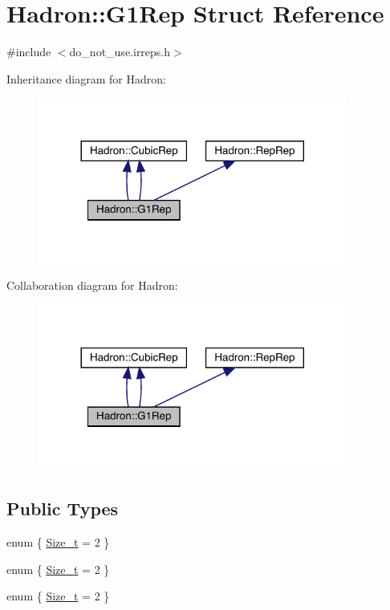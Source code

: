 \hypertarget{structHadron_1_1G1Rep}{}\section{Hadron\+:\+:G1\+Rep Struct Reference}
\label{structHadron_1_1G1Rep}


{\ttfamily \#include $<$do\+\_\+not\+\_\+use.\+irreps.\+h$>$}



Inheritance diagram for Hadron\+:\nopagebreak
\begin{figure}[H]
\begin{center}
\leavevmode
\includegraphics[width=288pt]{d5/d2d/structHadron_1_1G1Rep__inherit__graph}
\end{center}
\end{figure}


Collaboration diagram for Hadron\+:\nopagebreak
\begin{figure}[H]
\begin{center}
\leavevmode
\includegraphics[width=288pt]{d5/d5e/structHadron_1_1G1Rep__coll__graph}
\end{center}
\end{figure}
\subsection*{Public Types}
\begin{DoxyCompactItemize}
\item 
enum \{ \mbox{\hyperlink{structHadron_1_1G1Rep_a490cd012d114ed62e3a3878f24131f81a810ee4a46e1d11c4be51e1b7f08ebe60}{Size\+\_\+t}} = 2
 \}
\item 
enum \{ \mbox{\hyperlink{structHadron_1_1G1Rep_a490cd012d114ed62e3a3878f24131f81a810ee4a46e1d11c4be51e1b7f08ebe60}{Size\+\_\+t}} = 2
 \}
\item 
enum \{ \mbox{\hyperlink{structHadron_1_1G1Rep_a490cd012d114ed62e3a3878f24131f81a810ee4a46e1d11c4be51e1b7f08ebe60}{Size\+\_\+t}} = 2
 \}
\end{DoxyCompactItemize}

